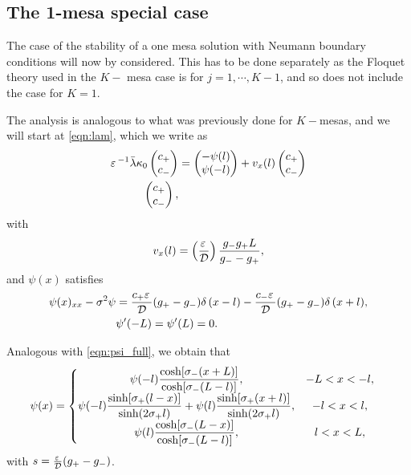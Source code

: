 \subsection{The 1-mesa special case}
\label{sec:1-mesa}

The case of the stability of a one mesa solution with Neumann boundary conditions will now by considered. This has to be done separately as the Floquet theory used in the $K-$ mesa case is for $j=1,\cdots,K-1$, and so does not include the case for $K=1$.

The analysis is analogous to what was previously done for $K-$mesas, and we will start at \eqref{eqn:lam}, which we write as
% 
\begin{equation}
	\begin{split}
	\varepsilon\,^{-1}\bar{\lambda}\kappa_0\begin{pmatrix}c_+\\c_-\end{pmatrix}
   &=
	\begin{pmatrix} -\psi(l) \\ \psi(-l) \end{pmatrix}
	 +v_x(l) \begin{pmatrix}c_+\\c_-\end{pmatrix}\\
	\begin{pmatrix}c_+\\c_-\end{pmatrix},
	\end{split}
\end{equation}
% 
with 
% 
\[
  v_x(l) = \left(\frac{\varepsilon\,}{\mathcal{D}}\right)\frac{g_-g_+L}{g_--g_+},
\]
% 
and $\psi(x)$ satisfies
% 
\begin{equation}
\label{eqn:psi2}
\begin{split}
  \psi(x)_{xx}-\sigma^2\psi &= \frac{c_+\varepsilon\,}{\mathcal{D}}(g_+-g_-)\delta\,(x-l) - \frac{c_-\varepsilon\,}{\mathcal{D}}(g_+-g_-)\delta\,(x+l),\\
  &\psi'(-L) = \psi'(L) = 0.
\end{split}
\end{equation}
% 

Analogous with \eqref{eqn:psi_full}, we obtain that 
% 
\begin{equation*}
	\begin{split}
	\psi(x) &= \left\{
	\begin{matrix}
	  \psi(-l)\dfrac{\cosh[\sigma_-(x+L)]}{\cosh[\sigma_-(L-l)]},&-L<x<-l,\\
	  \psi(-l)\dfrac{\sinh[\sigma_+(l-x)]}{\sinh(2\sigma_+l)} + \psi(l)\dfrac{\sinh[\sigma_+(x+l)]}{\sinh(2\sigma_+l)},&-l<x<l,\\
	  \psi(l)\dfrac{\cosh[\sigma_-(L-x)]}{\cosh[\sigma_-(L-l)]},&l<x<L,\\
	\end{matrix}\right.
	\end{split}
\end{equation*}
% 
with $s = \frac{\varepsilon\,}{\mathcal{D}}(g_+-g_-)$.


